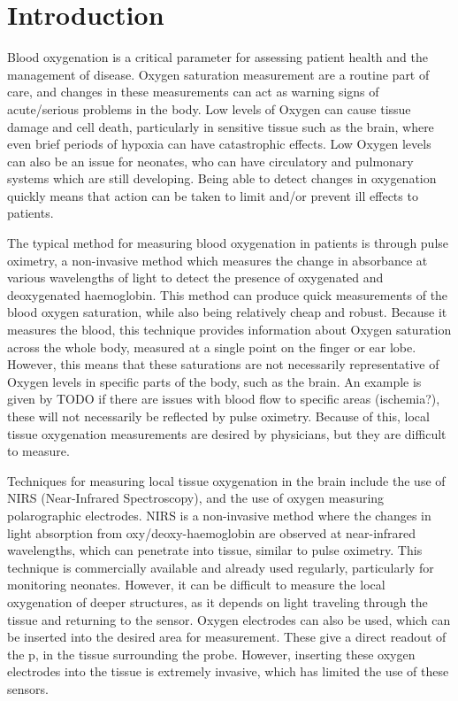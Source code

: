 \chapter{Introduction}\label{ch:intro}

Blood oxygenation is a critical parameter for assessing patient health and the management of disease.
Oxygen saturation measurement are a routine part of care, and changes in these measurements can act as warning signs of acute/serious problems in the body.
Low levels of Oxygen can cause tissue damage and cell death, particularly in sensitive tissue such as the brain, where even brief periods of
hypoxia can have catastrophic effects.
Low Oxygen levels can also be an issue for neonates, who can have circulatory and pulmonary systems which are still developing.
Being able to detect changes in oxygenation quickly means that action can be taken to limit and/or prevent ill effects to patients.

The typical method for measuring blood oxygenation in patients is through pulse oximetry, a non-invasive method which measures the change in absorbance at
various wavelengths of light to detect the presence of oxygenated and deoxygenated haemoglobin.
This method can produce quick measurements of the blood oxygen saturation, while also being relatively cheap and robust.
Because it measures the blood, this technique provides information about Oxygen saturation across the whole body, measured at a single point on the finger or ear lobe.
However, this means that these saturations are not necessarily representative of Oxygen levels in specific parts of the body, such as the brain.
An example is given by TODO if there are issues with blood flow to specific areas (ischemia?), these will not necessarily be reflected by pulse oximetry.
Because of this, local tissue oxygenation measurements are desired by physicians, but they are difficult to measure.

Techniques for measuring local tissue oxygenation in the brain include the use of NIRS (Near-Infrared Spectroscopy), and the use of oxygen measuring
polarographic electrodes.
NIRS is a non-invasive method where the changes in light absorption from oxy/deoxy-haemoglobin are observed at near-infrared wavelengths, which can penetrate
into tissue, similar to pulse oximetry.
This technique is commercially available and already used regularly, particularly for monitoring neonates.
However, it can be difficult to measure the local oxygenation of deeper structures, as it depends on light traveling through the tissue and returning to the sensor.
Oxygen electrodes can also be used, which can be inserted into the desired area for measurement.
These give a direct readout of the p\Otwo, in the tissue surrounding the probe.
However, inserting these oxygen electrodes into the tissue is extremely invasive, which has limited the use of these sensors.

